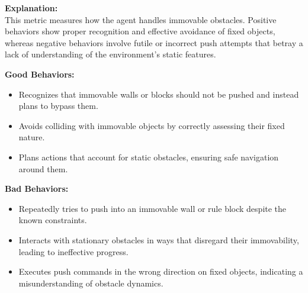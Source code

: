 \fontsize{9.5pt}{11pt}\selectfont
\begin{tcolorbox}[breakable, colback=gray!5!white, colframe=gray!90, title=\textbf{\textcolor{black}{Iteration 3: Interaction with Immovable Obstacles}}]
  
\textbf{Explanation:} \\
This metric measures how the agent handles immovable obstacles. Positive behaviors show proper recognition and effective avoidance of fixed objects, whereas negative behaviors involve futile or incorrect push attempts that betray a lack of understanding of the environment’s static features.

\vspace{1em}
\textbf{Good Behaviors:}
\begin{itemize}
    \item Recognizes that immovable walls or blocks should not be pushed and instead plans to bypass them.
    \item Avoids colliding with immovable objects by correctly assessing their fixed nature.
    \item Plans actions that account for static obstacles, ensuring safe navigation around them.
\end{itemize}

\vspace{0.5em}
\textbf{Bad Behaviors:}
\begin{itemize}
    \item Repeatedly tries to push into an immovable wall or rule block despite the known constraints.
    \item Interacts with stationary obstacles in ways that disregard their immovability, leading to ineffective progress.
    \item Executes push commands in the wrong direction on fixed objects, indicating a misunderstanding of obstacle dynamics.
\end{itemize}

\end{tcolorbox}